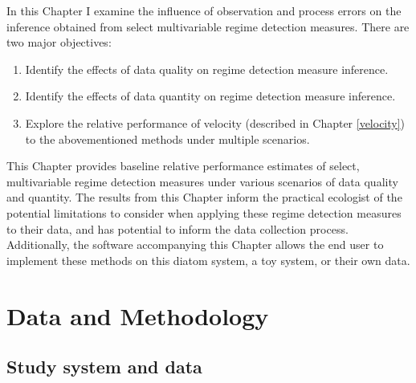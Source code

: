 \documentclass[12pt,twoside,openany]{reedthesis}
\begin{document}
In this Chapter I examine the influence of observation and process
errors on the inference obtained from select multivariable regime
detection measures. There are two major objectives:
\begin{enumerate}
\def\labelenumi{\arabic{enumi}.}
\item
  Identify the effects of data quality on regime detection measure
  inference.
\item
  Identify the effects of data quantity on regime detection measure
  inference.
\item
  Explore the relative performance of velocity (described in Chapter
  \ref{velocity}) to the abovementioned methods under multiple
  scenarios.
\end{enumerate}
This Chapter provides baseline relative performance estimates of select,
multivariable regime detection measures under various scenarios of data
quality and quantity. The results from this Chapter inform the practical
ecologist of the potential limitations to consider when applying these
regime detection measures to their data, and has potential to inform the
data collection process. Additionally, the software accompanying this
Chapter allows the end user to implement these methods on this diatom
system, a toy system, or their own data.

\section{Data and Methodology}\label{data-and-methodology}

\subsection{Study system and data}\label{study-system-and-data}
\end{document}
